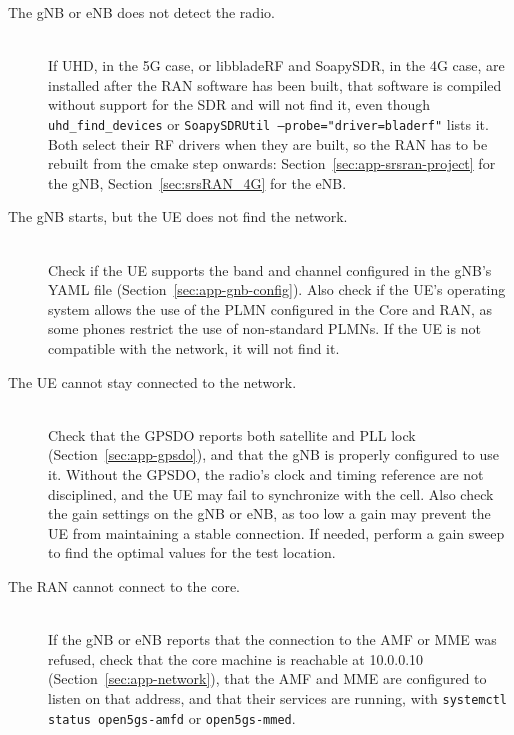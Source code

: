\begin{description}
    \item[The \gls{gNB} or \gls{eNB} does not detect the radio.]~\\
    If UHD, in the 5G case, or libbladeRF and SoapySDR, in the 4G case, are installed after the \gls{RAN} software has been built, that software is compiled without support for the \gls{SDR} and will not find it, even though \texttt{uhd\_find\_devices} or \texttt{SoapySDRUtil --probe="driver=bladerf"} lists it. Both select their \gls{RF} drivers when they are built, so the \gls{RAN} has to be rebuilt from the cmake step onwards: Section~\ref{sec:app-srsran-project} for the \gls{gNB}, Section~\ref{sec:srsRAN_4G} for the \gls{eNB}.

    \item[The \gls{gNB} starts, but the \gls{UE} does not find the network.]~\\
    Check if the \gls{UE} supports the band and channel configured in the \gls{gNB}'s YAML file (Section~\ref{sec:app-gnb-config}). Also check if the \gls{UE}'s operating system allows the use of the \gls{PLMN} configured in the Core and \gls{RAN}, as some phones restrict the use of non-standard PLMNs. If the \gls{UE} is not compatible with the network, it will not find it.

    \item[The \gls{UE} cannot stay connected to the network.]~\\
    Check that the \gls{GPSDO} reports both satellite and PLL lock (Section~\ref{sec:app-gpsdo}), and that the \gls{gNB} is properly configured to use it. Without the \gls{GPSDO}, the radio's clock and timing reference are not disciplined, and the \gls{UE} may fail to synchronize with the cell. Also check the gain settings on the \gls{gNB} or \gls{eNB}, as too low a gain may prevent the \gls{UE} from maintaining a stable connection. If needed, perform a gain sweep to find the optimal values for the test location.

    \item[The \gls{RAN} cannot connect to the core.]~\\
    If the \gls{gNB} or \gls{eNB} reports that the connection to the \gls{AMF} or \gls{MME} was refused, check that the core machine is reachable at 10.0.0.10 (Section~\ref{sec:app-network}), that the \gls{AMF} and \gls{MME} are configured to listen on that address, and that their services are running, with \texttt{systemctl status open5gs-amfd} or \texttt{open5gs-mmed}.


\end{description}
